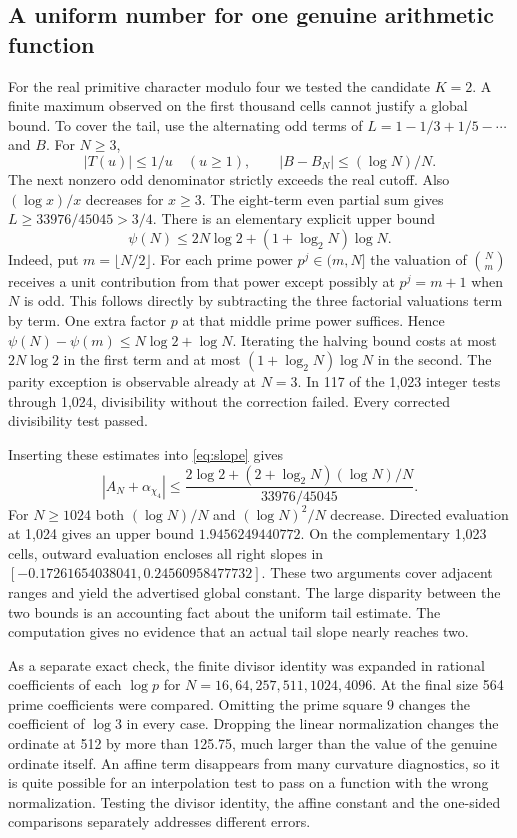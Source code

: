 \documentclass[12pt,letterpaper]{article}
\begin{document}
\subsection{A uniform number for one genuine arithmetic function}
For the real primitive character modulo four we tested the candidate \(K=2\). A finite maximum observed on the first thousand cells cannot justify a global bound. To cover the tail, use the alternating odd terms of \(L=1-1/3+1/5-\cdots\) and \(B\). For \(N\ge3\),
\[
 |T(u)|\le 1/u\quad(u\ge1),\qquad |B-B_N|\le(\log N)/N.
\]
The next nonzero odd denominator strictly exceeds the real cutoff. Also \((\log x)/x\) decreases for \(x\ge3\). The eight-term even partial sum gives \(L\ge33976/45045>3/4\). There is an elementary explicit upper bound
\[
 \psi(N)\le 2N\log2+(1+\log_2 N)\log N .
\]
Indeed, put \(m=\lfloor N/2\rfloor\). For each prime power \(p^j\in(m,N]\) the valuation of \(\binom{N}{m}\) receives a unit contribution from that power except possibly at \(p^j=m+1\) when \(N\) is odd. This follows directly by subtracting the three factorial valuations term by term. One extra factor \(p\) at that middle prime power suffices. Hence \(\psi(N)-\psi(m)\le N\log 2+\log N\). Iterating the halving bound costs at most \(2N\log2\) in the first term and at most \((1+\log_2 N)\log N\) in the second. The parity exception is observable already at \(N=3\). In 117 of the 1,023 integer tests through 1,024, divisibility without the correction failed. Every corrected divisibility test passed.

Inserting these estimates into \eqref{eq:slope} gives
\[
 |A_N+\alpha_{\chi_4}|\le
 \frac{2\log2+(2+\log_2 N)(\log N)/N}{33976/45045}.
\]
For \(N\ge1024\) both \((\log N)/N\) and \((\log N)^2/N\) decrease. Directed evaluation at 1,024 gives an upper bound \(1.9456249440772\). On the complementary 1,023 cells, outward evaluation encloses all right slopes in \([-0.17261654038041,0.24560958477732]\). These two arguments cover adjacent ranges and yield the advertised global constant. The large disparity between the two bounds is an accounting fact about the uniform tail estimate. The computation gives no evidence that an actual tail slope nearly reaches two.

As a separate exact check, the finite divisor identity was expanded in rational coefficients of each \(\log p\) for \(N=16,64,257,511,1024,4096\). At the final size 564 prime coefficients were compared. Omitting the prime square \(9\) changes the coefficient of \(\log 3\) in every case. Dropping the linear normalization changes the ordinate at 512 by more than 125.75, much larger than the value of the genuine ordinate itself. An affine term disappears from many curvature diagnostics, so it is quite possible for an interpolation test to pass on a function with the wrong normalization. Testing the divisor identity, the affine constant and the one-sided comparisons separately addresses different errors.
\end{document}
